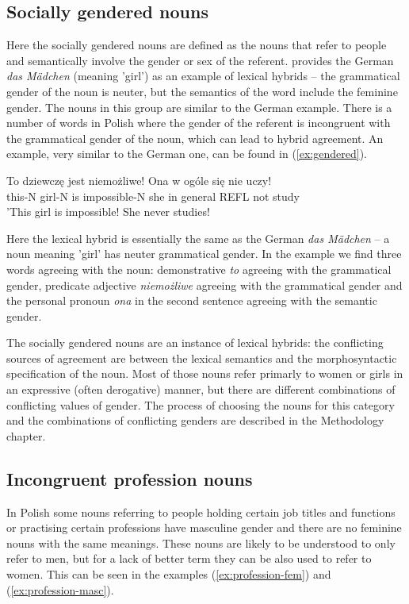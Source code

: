 \subsection{Socially gendered nouns}
Here the socially gendered nouns are defined as the nouns that refer to people and semantically involve the gender or sex of the referent. \cite{corbett_agreement_2023} provides the German \textsl{das M{\"a}dchen} (meaning 'girl') as an example of lexical hybrids -- the grammatical gender of the noun is neuter, but the semantics of the word include the feminine gender. The nouns in this group are similar to the German example. There is a number of words in Polish where the gender of the referent is incongruent with the grammatical gender of the noun, which can lead to hybrid agreement. An example, very similar to the German one, can be found in (\ref{ex:gendered}). 

\begin{exe}
  \ex\label{ex:gendered}
  \gll To dziewczę jest niemożliwe! Ona w ogóle się nie uczy!\\
  this-N girl-N is impossible-N she in general REFL not study\\
  \glt 'This girl is impossible! She never studies!
\end{exe}

Here the lexical hybrid is essentially the same as the German \textsl{das M{\"a}dchen} -- a noun meaning 'girl' has neuter grammatical gender. In the example we find three words agreeing with the noun: demonstrative \textsl{to} agreeing with the grammatical gender, predicate adjective \textsl{niemożliwe} agreeing with the grammatical gender and the personal pronoun \textsl{ona} in the second sentence agreeing with the semantic gender.

The socially gendered nouns are an instance of lexical hybrids: the conflicting sources of agreement are between the lexical semantics and the morphosyntactic specification of the noun. Most of those nouns refer primarly to women or girls in an expressive (often derogative) manner, but there are different combinations of conflicting values of gender. The process of choosing the nouns for this category and the combinations of conflicting genders are described in the Methodology chapter.

\subsection{Incongruent profession nouns}
In Polish some nouns referring to people holding certain job titles and functions or practising certain professions have masculine gender and there are no feminine nouns with the same meanings. These nouns are likely to be understood to only refer to men, but for a lack of better term they can be also used to refer to women. This can be seen in the examples (\ref{ex:profession-fem}) and (\ref{ex:profession-masc}).

